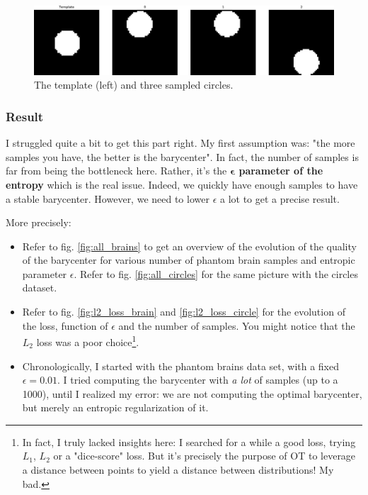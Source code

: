 \begin{figure}[h]
    \centering
    \includegraphics[width=.8\textwidth]{samples/2/some_circles.png}
    \caption{The template (left) and three sampled circles.}
    \label{fig:circles}
\end{figure}

\FloatBarrier
\subsubsection{Result}

I struggled quite a bit to get this part right. My first assumption was: "the more samples you have, the better is the barycenter". In fact, the number of samples is far from being the bottleneck here. Rather, it's the \textbf{$\mathbf{\epsilon}$ parameter of the entropy} which is the real issue. Indeed, we quickly have enough samples to have a stable barycenter. However, we need to lower $\epsilon$ a lot to get a precise result.

More precisely: 
\begin{itemize}
    \item Refer to fig. \ref{fig:all_brains} to get an overview of the evolution of the quality of the barycenter for various number of phantom brain samples and entropic parameter $\epsilon$. Refer to fig. \ref{fig:all_circles} for the same picture with the circles dataset. 
    \item Refer to fig. \ref{fig:l2_loss_brain} and \ref{fig:l2_loss_circle} for the evolution of the loss, function of $\epsilon$ and the number of samples. You might notice that the $L_2$ loss was a poor choice\footnote{\label{my_error}In fact, I truly lacked insights here: I searched for a while a good loss, trying $L_1$, $L_2$ or a "dice-score" loss. But it's precisely the purpose of OT to leverage a distance between points to yield a distance between distributions! My bad.}.
    \item Chronologically, I started with the phantom brains data set, with a fixed $\epsilon=0.01$. I tried computing the barycenter with \textit{a lot} of samples (up to a 1000), until I realized my error: we are not computing the optimal barycenter, but merely an entropic regularization of it.
\end{itemize}


